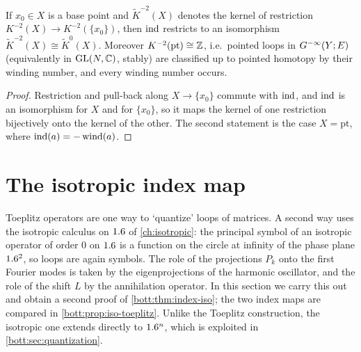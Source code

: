 \begin{corollary}\label{bott:cor:reduced}
  If $x_0\in X$ is a base point and $\tilde K^{-2}(X)$ denotes the kernel of restriction
  $K^{-2}(X)\to K^{-2}(\{x_0\})$, then $\operatorname{ind}$ restricts to an isomorphism
  $\tilde K^{-2}(X)\cong\tilde K^0(X)$. Moreover $K^{-2}(\mathrm{pt})\cong\mathbb{Z}$, i.e.\
  pointed loops in $G^{-\infty}(Y;E)$ (equivalently in $\operatorname{GL}(N,\mathbb{C})$, stably) are classified up to
  pointed homotopy by their winding number, and every winding number occurs.
\end{corollary}
\begin{proof}
  Restriction and pull-back along $X\to\{x_0\}$ commute with $\operatorname{ind}$, and $\operatorname{ind}$ is an
  isomorphism for $X$ and for $\{x_0\}$, so it maps the kernel of one restriction
  bijectively onto the kernel of the other. The second statement is the case $X=\mathrm{pt}$,
  where $\operatorname{ind}(a)=-\operatorname{wind}(a)$.
\end{proof}

\section{The isotropic index map}\label{bott:sec:isotropic}

Toeplitz operators are one way to `quantize' loops of matrices. A second way uses the
isotropic calculus on $1.6$ of \cref{ch:isotropic}: the principal symbol of an isotropic
operator of order $0$ on $1.6$ is a function on the circle at infinity of the phase
plane $1.6^2$, so loops are again symbols. The role of the projections $P_k$ onto the
first Fourier modes is taken by the eigenprojections of the harmonic oscillator, and
the role of the shift $L$ by the annihilation operator. In this section we carry this
out and obtain a second proof of \cref{bott:thm:index-iso}; the two index maps are
compared in \cref{bott:prop:iso-toeplitz}. Unlike the Toeplitz construction, the
isotropic one extends directly to $1.6^n$, which is exploited in
\cref{bott:sec:quantization}.

